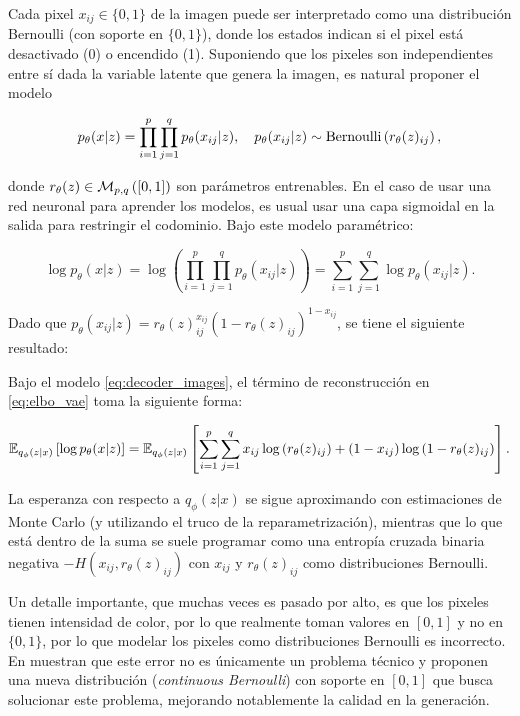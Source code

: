 Cada pixel $x_{ij}\in\{0,1\}$ de la imagen puede ser interpretado como una distribución Bernoulli (con soporte en $\{0,1\}$), donde los estados indican si el pixel está desactivado (0) o encendido (1). Suponiendo que los pixeles son independientes entre sí dada la variable latente que genera la imagen, es natural proponer el modelo

\begin{equation}
    \label{eq:decoder_images}
    p_\theta(x|z)=\prod_{i=1}^p\prod_{j=1}^q p_\theta(x_{ij}|z),
    \quad
    p_\theta(x_{ij}|z) \sim \operatorname{Bernoulli}\left(r_\theta(z)_{ij}\right),
\end{equation}

donde $r_\theta(z)\in\mathcal{M}_{p,q}\left([0,1]\right)$ son parámetros entrenables. En el caso de usar una red neuronal para aprender los modelos, es usual usar una capa sigmoidal en la salida para restringir el codominio. Bajo este modelo paramétrico:

\begin{equation*}
    \log p_\theta(x|z)
    = \log\left(\prod_{i=1}^p\prod_{j=1}^q p_\theta(x_{ij}|z)\right)
    = \sum_{i=1}^p\sum_{j=1}^q \log p_\theta(x_{ij}|z).
\end{equation*}

Dado que $p_\theta(x_{ij}|z) = r_\theta(z)_{ij}^{x_{ij}}(1-r_\theta(z)_{ij})^{1-x_{ij}}$, se tiene el siguiente resultado:

\begin{prop}
    Bajo el modelo \eqref{eq:decoder_images}, el término de reconstrucción en \eqref{eq:elbo_vae} toma la siguiente forma:

    \begin{equation*}
        \mathbb{E}_{q_\phi(z|x)}\left[\log p_\theta(x|z)\right]
        = \mathbb{E}_{q_\phi(z|x)}\left[\sum_{i=1}^p \sum_{j=1}^q x_{ij}\log\left(r_\theta(z)_{ij}\right)+(1-x_{ij})\log\left(1-r_\theta(z)_{ij}\right)\right].
    \end{equation*}
\end{prop}

La esperanza con respecto a $q_\phi(z|x)$ se sigue aproximando con estimaciones de Monte Carlo (y utilizando el truco de la reparametrización), mientras que lo que está dentro de la suma se suele programar como una entropía cruzada binaria negativa $-H(x_{ij},r_\theta(z)_{ij})$ con $x_{ij}$ y $r_\theta(z)_{ij}$ como distribuciones Bernoulli.

Un detalle importante, que muchas veces es pasado por alto, es que los pixeles tienen intensidad de color, por lo que realmente toman valores en $[0,1]$ y no en $\{0,1\}$, por lo que modelar los pixeles como distribuciones Bernoulli es incorrecto. En \cite{loaizaganem2019continuous} muestran que este error no es únicamente un problema técnico y proponen una nueva distribución (\textit{continuous Bernoulli}) con soporte en $[0,1]$ que busca solucionar este problema, mejorando notablemente la calidad en la generación.


